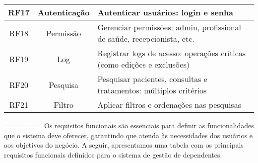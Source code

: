 \begin{quadro}
\begin{tabular}{|c|c|p{10cm}|}
        RF17   & Autenticação & Autenticar usuários: login e senha \\ \hline
        RF18   & Permissão    & Gerenciar permissões: admin, profissional de saúde, recepcionista, etc. \\ \hline
        RF19   & Log          & Registrar logs de acesso: operações críticas (como edições e exclusões) \\ \hline
        RF20   & Pesquisa     & Pesquisar pacientes, consultas e tratamentos: múltiplos critérios \\ \hline
        RF21   & Filtro       & Aplicar filtros e ordenações nas pesquisas \\ \hline
    \end{tabular}
\end{quadro}
=======
Os requisitos funcionais são essenciais para definir as funcionalidades que o sistema deve oferecer, garantindo que atenda às necessidades dos usuários e aos objetivos do negócio. A seguir, apresentamos uma tabela com os principais requisitos funcionais definidos para o sistema de gestão de dependentes.

